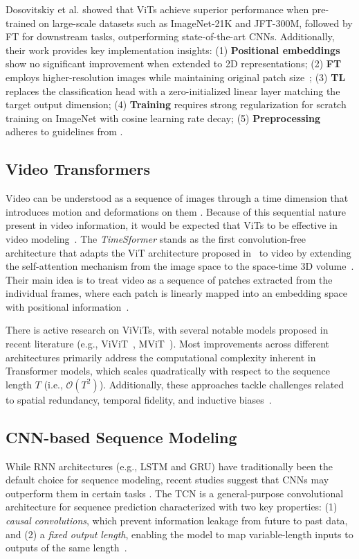\documentclass[runningheads]{llncs}
\begin{document}
Dosovitskiy et al. showed that \ac{ViTs} achieve
superior performance when pre-trained on large-scale datasets such as
ImageNet-21K and JFT-300M, followed by \ac{FT} for downstream
tasks, outperforming state-of-the-art \ac{CNNs}. Additionally, their
work provides key implementation insights: (1) \textbf{Positional
  embeddings} show no significant improvement when extended to 2D
representations; (2) \textbf{\ac{FT}} employs higher-resolution
images while maintaining original patch size~\cite{Kolesnikov2019};
(3) \textbf{\ac{TL}} replaces the classification head with a
zero-initialized linear layer matching the target output dimension;
(4) \textbf{Training} requires strong regularization for scratch
training on ImageNet with cosine learning rate decay; (5)
\textbf{Preprocessing} adheres to guidelines from
\cite{Kolesnikov2019}. 

\subsection{Video Transformers}
\label{sec:video-transformers}
Video can be understood as a sequence of images through a time
dimension that introduces motion and deformations on them
\cite{Selva_2023}. Because of this sequential nature present in video
information, it would be expected that \ac{ViTs} to be effective in
video modeling~\cite{Bertasius2021}. The \textit{TimeSformer} stands
as the first convolution-free architecture that adapts the \ac{ViT}
architecture proposed in~\cite{dosovitskiy2020image} to video by
extending the self-attention mechanism from the image space to the
space-time 3D volume~\cite{Bertasius2021}. Their main idea is to treat
video as a sequence of patches extracted from the individual frames,
where each patch is linearly mapped into an embedding space with
positional information~\cite{Bertasius2021}.

There is active research on \ac{ViViTs}, with several notable
models proposed in recent literature (e.g., ViViT~\cite{Arnab2021},
MViT~\cite{Fan2021}). Most improvements across different architectures
primarily address the computational complexity inherent in Transformer
models, which scales quadratically with respect to the sequence length
$T$ (i.e., $\mathcal{O}(T^2)$). Additionally, these approaches tackle
challenges related to spatial redundancy, temporal fidelity, and
inductive biases~\cite{Selva_2023}.

\subsection{CNN-based Sequence Modeling}
\label{sec:sequence-modeling}
While \ac{RNN} architectures (e.g., LSTM and GRU) have traditionally
been the default choice for sequence modeling, recent studies suggest
that \ac{CNNs} may outperform them in certain tasks
\cite{Bai2018}. The \ac{TCN} is a general-purpose convolutional
architecture for sequence prediction characterized with two key
properties: (1) \emph{causal convolutions}, which prevent information
leakage from future to past data, and (2) a \emph{fixed output
  length}, enabling the model to map variable-length inputs to outputs
of the same length~\cite{Bai2018}.
\end{document}
